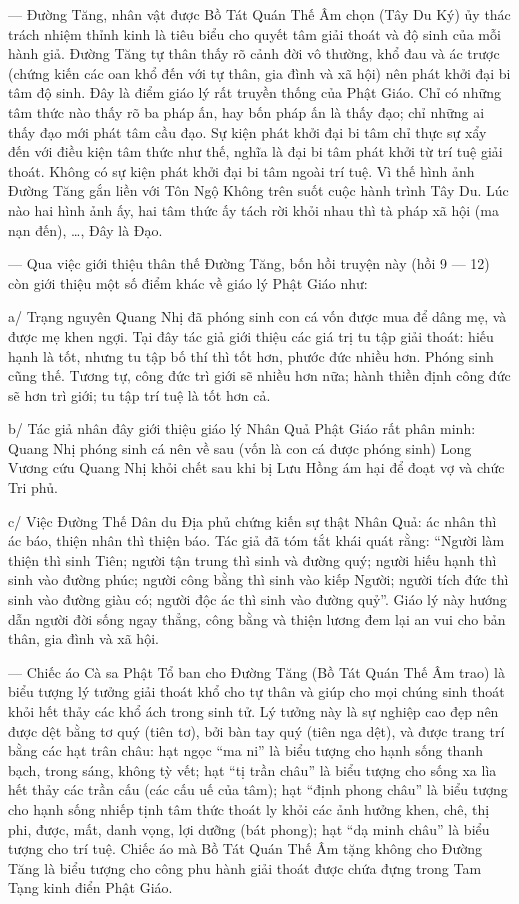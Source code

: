 — Đường Tăng, nhân vật được Bồ Tát Quán Thế Âm chọn (Tây Du Ký) ủy thác trách nhiệm thỉnh kinh là tiêu biểu cho quyết tâm giải thoát và độ sinh của mỗi hành giả. Đường Tăng tự thân thấy rõ cảnh đời vô thường, khổ đau và ác trược (chứng kiến các oan khổ đến với tự thân, gia đình và xã hội) nên phát khởi đại bi tâm độ sinh. Đây là điểm giáo lý rất truyền thống của Phật Giáo. Chỉ có những tâm thức nào thấy rõ ba pháp ấn, hay bốn pháp ấn là thấy đạo; chỉ những ai thấy đạo mới phát tâm cầu đạo. Sự kiện phát khởi đại bi tâm chỉ thực sự xẩy đến với điều kiện tâm thức như thế, nghĩa là đại bi tâm phát khởi từ trí tuệ giải thoát. Không có sự kiện phát khởi đại bi tâm ngoài trí tuệ. Vì thế hình ảnh Đường Tăng gắn liền với Tôn Ngộ Không trên suốt cuộc hành trình Tây Du. Lúc nào hai hình ảnh ấy, hai tâm thức ấy tách rời khỏi nhau thì tà pháp xã hội (ma nạn đến), \ldots, Đây là Đạo.

— Qua việc giới thiệu thân thế Đường Tăng, bốn hồi truyện này (hồi 9 — 12) còn giới thiệu một số điểm khác về giáo lý Phật Giáo như:

a/ Trạng nguyên Quang Nhị đã phóng sinh con cá vốn được mua để dâng mẹ, và được mẹ khen ngợi. Tại đây tác giả giới thiệu các giá trị tu tập giải thoát: hiếu hạnh là tốt, nhưng tu tập bố thí thì tốt hơn, phước đức nhiều hơn. Phóng sinh cũng thế. Tương tự, công đức trì giới sẽ nhiều hơn nữa; hành thiền định công đức sẽ hơn trì giới; tu tập trí tuệ là tốt hơn cả.

b/ Tác giả nhân đây giới thiệu giáo lý Nhân Quả Phật Giáo rất phân minh: Quang Nhị phóng sinh cá nên về sau (vốn là con cá được phóng sinh) Long Vương cứu Quang Nhị khỏi chết sau khi bị Lưu Hồng ám hại để đoạt vợ và chức Tri phủ.

c/ Việc Đường Thế Dân du Địa phủ chứng kiến sự thật Nhân Quả: ác nhân thì ác báo, thiện nhân thì thiện báo. Tác giả đã tóm tắt khái quát rằng: ``Người làm thiện thì sinh Tiên; người tận trung thì sinh và đường quý; người hiếu hạnh thì sinh vào đường phúc; người công bằng thì sinh vào kiếp Người; người tích đức thì sinh vào đường giàu có; người độc ác thì sinh vào đường quỷ''. Giáo lý này hướng dẫn người đời sống ngay thẳng, công bằng và thiện lương đem lại an vui cho bản thân, gia đình và xã hội.

— Chiếc áo Cà sa Phật Tổ ban cho Đường Tăng (Bồ Tát Quán Thế Âm trao) là biểu tượng lý tưởng giải thoát khổ cho tự thân và giúp cho mọi chúng sinh thoát khỏi hết thảy các khổ ách trong sinh tử. Lý tưởng này là sự nghiệp cao đẹp nên được dệt bằng tơ quý (tiên tơ), bởi bàn tay quý (tiên nga dệt), và được trang trí bằng các hạt trân châu: hạt ngọc ``ma ni'' là biểu tượng cho hạnh sống thanh bạch, trong sáng, không tỳ vết; hạt ``tị trần châu'' là biểu tượng cho sống xa lìa hết thảy các trần cấu (các cấu uế của tâm); hạt ``định phong châu'' là biểu tượng cho hạnh sống nhiếp tịnh tâm thức thoát ly khỏi các ảnh hưởng khen, chê, thị phi, được, mất, danh vọng, lợi dưỡng (bát phong); hạt ``dạ minh châu'' là biểu tượng cho trí tuệ. Chiếc áo mà Bồ Tát Quán Thế Âm tặng không cho Đường Tăng là biểu tượng cho công phu hành giải thoát được chứa đựng trong Tam Tạng kinh điển Phật Giáo.

